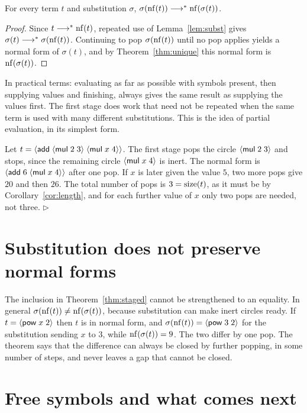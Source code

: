 \begin{theorem}\label{thm:staged}
For every term $t$ and substitution $\sigma$, $\sigma(\operatorname{nf}(t))\longrightarrow^{*}\operatorname{nf}(\sigma(t))$.
\end{theorem}
\begin{proof}
Since $t\longrightarrow^{*}\operatorname{nf}(t)$, repeated use of Lemma~\ref{lem:subst} gives $\sigma(t)\longrightarrow^{*}\sigma(\operatorname{nf}(t))$. Continuing to pop $\sigma(\operatorname{nf}(t))$ until no pop applies yields a normal form of $\sigma(t)$, and by Theorem~\ref{thm:unique} this normal form is $\operatorname{nf}(\sigma(t))$.
\end{proof}

In practical terms: evaluating as far as possible with symbols present, then supplying values and finishing, always gives the same result as supplying the values first. The first stage does work that need not be repeated when the same term is used with many different substitutions. This is the idea of partial evaluation, in its simplest form.

\begin{example}
Let $t=\langle \mathsf{add}\; \langle \mathsf{mul}\; 2\; 3\rangle\; \langle \mathsf{mul}\; x\; 4\rangle\rangle$. The first stage pops the circle $\langle \mathsf{mul}\; 2\; 3\rangle$ and stops, since the remaining circle $\langle \mathsf{mul}\; x\; 4\rangle$ is inert. The normal form is $\langle \mathsf{add}\; 6\; \langle \mathsf{mul}\; x\; 4\rangle\rangle$ after one pop. If $x$ is later given the value $5$, two more pops give $20$ and then $26$. The total number of pops is $3=\operatorname{size}(t)$, as it must be by Corollary~\ref{cor:length}, and for each further value of $x$ only two pops are needed, not three. \hfill$\triangleright$
\end{example}

\section{Substitution does not preserve normal forms}

The inclusion in Theorem~\ref{thm:staged} cannot be strengthened to an equality. In general $\sigma(\operatorname{nf}(t))\neq\operatorname{nf}(\sigma(t))$, because substitution can make inert circles ready. If $t=\langle \mathsf{pow}\; x\; 2\rangle$ then $t$ is in normal form, and $\sigma(\operatorname{nf}(t))=\langle \mathsf{pow}\; 3\; 2\rangle$ for the substitution sending $x$ to $3$, while $\operatorname{nf}(\sigma(t))=9$. The two differ by one pop. The theorem says that the difference can always be closed by further popping, in some number of steps, and never leaves a gap that cannot be closed.

\section{Free symbols and what comes next}

